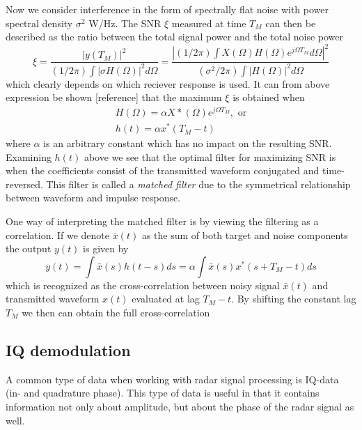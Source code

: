 \documentclass[a4paper, 12pt]{article}
\begin{document}
Now we consider interference in the form of spectrally flat noise with power spectral density $\sigma^2$ W/Hz. The SNR $\xi$ measured at time $T_M$ can then be described as the ratio between the total signal power and the total noise power
%
\begin{equation}
	\xi
	= \frac{|y(T_M)|^{2}}{(1/2\pi)\int|\sigma H(\Omega)|^{2}d\Omega}
	= \frac{|(1/2\pi)\int X(\Omega)H(\Omega)e^{j\Omega T_M}d\Omega|^2}{(\sigma^2/2\pi)\int|H(\Omega)|^{2}d\Omega}
\end{equation}
%
which clearly depends on which reciever response is used. It can from above expression be shown [reference] that the maximum $\xi$ is obtained when 
%
\begin{gather}
 H(\Omega) = \alpha X*(\Omega)e^{j\Omega T_M}, \text{ or} \\
\label{eq:123}
h(t) = \alpha x^*(T_M - t)
\end{gather}
%
where $\alpha$ is an arbitrary constant which has no impact on the resulting SNR. Examining $h(t)$ above we see that the optimal filter for maximizing SNR is when the coefficients consist of the transmitted waveform conjugated and time-reversed. This filter is called a \emph{matched filter} due to the symmetrical relationship between waveform and impulse response.

One way of interpreting the matched filter is by viewing the filtering as a correlation. If we denote $\bar{x}(t)$ as the sum of both target and noise components the output $y(t)$ is given by
%
\begin{equation}
	y(t) = \int \bar{x}(s)h(t-s)ds = \alpha\int \bar{x}(s)x^*(s + T_M - t)ds
\end{equation}
%
which is recognized as the cross-correlation between noisy signal $\bar	{x}(t)$ and transmitted waveform $x(t)$ evaluated at lag $T_M-t$. By shifting the constant lag $T_M$ we then can obtain the full cross-correlation 

\subsection{IQ demodulation}
A common type of data when working with radar signal processing is IQ-data (in- and quadrature phase).  This type of data is useful in that it contains information not only about amplitude, but about the phase of the radar signal as well. 
\end{document}
